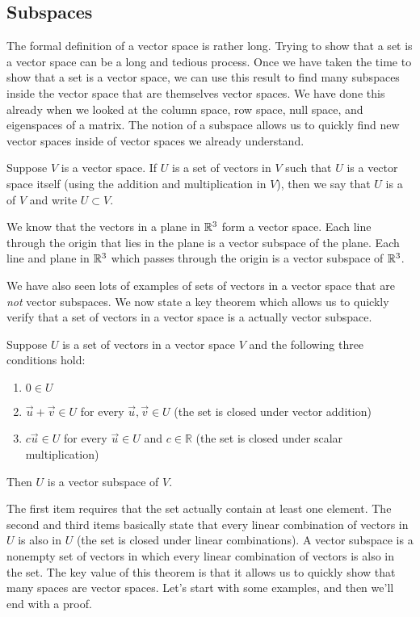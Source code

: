 \subsection{Subspaces}
The formal definition of a vector space is rather long. Trying to show that a set is a vector space can be a long and tedious process. Once we have taken the time to show that a set is a vector space, we can use this result to find many subspaces inside the vector space that are themselves vector spaces.  We have done this already when we looked at the column space, row space, null space, and eigenspaces of a matrix. The notion of a subspace allows us to quickly find new vector spaces inside of vector spaces we already understand.

\begin{definition}
Suppose $V$ is a vector space. If $U$ is a set of vectors in $V$ such that $U$ is a vector space itself (using the addition and multiplication in $V$), then we say that $U$ is a  of $V$ and write $U\subset V$.   
\end{definition}

\begin{example}
We know that the vectors in a plane in $\mathbb{R}^3$ form a vector space. Each line through the origin that lies in the plane is a vector subspace of the plane. Each  line and plane in $\mathbb{R}^3$ which passes through the origin is a vector subspace of $\mathbb{R}^3$. 
\end{example}

We have also seen lots of examples of sets of vectors in a vector space that are \emph{not} vector subspaces.  We now state a key theorem which allows us to quickly verify that a set of vectors in a vector space is a actually vector subspace.

\begin{theorem}\label{thm subspace iff closed}
Suppose $U$ is a set of vectors in a vector space $V$ and the following three conditions hold:
\begin{enumerate}
  \item $0\in U$
	\item $\vec u+\vec v\in U$ for every $\vec u,\vec v\in U$ (the set is closed under vector addition)
	\item $c\vec u\in U$ for every $\vec u\in U$ and $c\in {\mathbb{R}}$ (the set is closed under scalar multiplication)
\end{enumerate}
Then $U$ is a vector subspace of $V$. 
\end{theorem}
The first item requires that the set actually contain at least one element.  
The second and third items basically state that every linear combination of vectors in $U$ is also in $U$ (the set is closed under linear combinations). 
A vector subspace is a nonempty set of vectors in which every linear combination of vectors is also in the set. 
The key value of this theorem is that it allows us to quickly show that many spaces are vector spaces.  
Let's start with some examples, and then we'll end with a proof.




